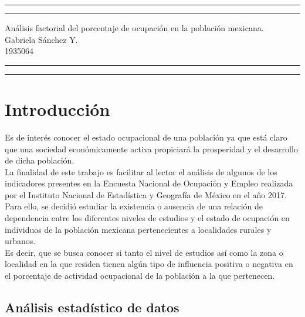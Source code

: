 \documentclass[12pt]{article}
\begin{document}
\thispagestyle{empty}
\hrule height2.5pt
\vspace{.1cm}
\hrule height1pt
\vspace{.3cm}

\begin{center}
\Large {An\'alisis factorial del porcentaje de ocupaci\'on en la poblaci\'on mexicana.} \bigskip \\
{ Gabriela S\'anchez Y.\\
1935064}
\end{center}

\vspace{.3cm}
\hrule height1pt
\vspace{.1cm}
\hrule height2.5pt
\vspace*{.5cm}


\section{Introducci\'on}
Es de inter\'es conocer el estado ocupacional de una poblaci\'on ya que est\'a claro que una sociedad econ\'omicamente activa propiciar\'a la prosperidad y el desarrollo de dicha poblaci\'on.  \bigskip \\
La finalidad de este trabajo es facilitar al lector el an\'alisis de algunos de los indicadores presentes en la Encuesta Nacional de Ocupaci\'on y Empleo realizada por el Instituto Nacional de Estad\'istica y Geograf\'ia de M\'exico en el a\~no 2017. \bigskip \\
Para ello, se decidi\'o estudiar la existencia o ausencia de una relaci\'on de dependencia entre los diferentes niveles de estudios y el estado de ocupaci\'on en individuos de la poblaci\'on mexicana pertenecientes a localidades rurales y urbanos. \bigskip \\
Es decir, que se busca conocer si tanto el nivel de estudios as\'i como la zona o localidad en la que residen tienen alg\'un tipo de influencia positiva o negativa en el porcentaje de actividad ocupacional de la poblaci\'on a la que pertenecen.




\subsection{An\'alisis estad\'istico de datos}

 

\nocite{*}


\end{document}
